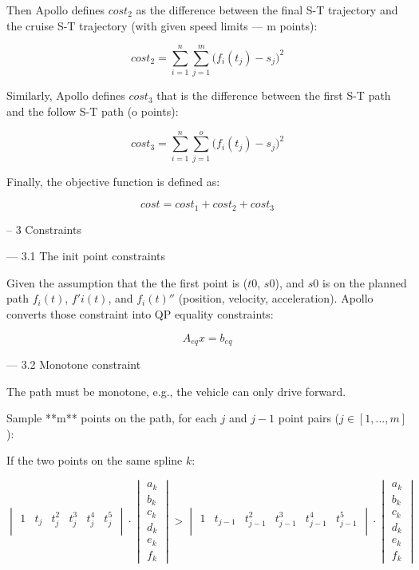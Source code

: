 \documentclass[a4paper,11pt]{article}  %
\begin{document}
Then Apollo defines $cost_2$ as the difference between the final S-T trajectory and the cruise S-T trajectory (with given speed limits — m points):

$$
cost_2 = \sum_{i=1}^{n}\sum_{j=1}^{m}\Big(f_i(t_j)- s_j\Big)^2
$$

Similarly, Apollo defines $cost_3$ that is the difference between the first S-T path and the follow S-T path (o points):

$$
cost_3 = \sum_{i=1}^{n}\sum_{j=1}^{o}\Big(f_i(t_j)- s_j\Big)^2
$$

Finally, the objective function is defined as: 

$$
cost = cost_1 + cost_2 + cost_3
$$


-- 3  Constraints  

--- 3.1 The init point constraints

Given the assumption that the the first point is ($t0$, $s0$), and $s0$ is on the planned path $f_i(t)$, $f'i(t)$, and $f_i(t)''$ (position, velocity, acceleration).  Apollo converts those constraint into QP equality constraints:

$$
A_{eq}x = b_{eq}
$$


--- 3.2  Monotone constraint

The path must be monotone, e.g., the vehicle can only drive forward. 

Sample **m** points on the path, for each $j$ and $j-1$ point pairs ($j\in[1,...,m]$): 

If the two points on the same spline $k$:

$$
\begin{vmatrix}  1 & t_j & t_j^2 & t_j^3 & t_j^4&t_j^5 \\ \end{vmatrix} 
\cdot 
\begin{vmatrix}  a_k \\ b_k \\ c_k \\ d_k \\ e_k \\ f_k  \end{vmatrix} 
> 
\begin{vmatrix}  1 & t_{j-1} & t_{j-1}^2 & t_{j-1}^3 & t_{j-1}^4&t_{j-1}^5 \\ \end{vmatrix}  
\cdot 
\begin{vmatrix}  a_{k} \\ b_{k} \\ c_{k} \\ d_{k} \\ e_{k} \\ f_{k}  \end{vmatrix}
$$
\end{document}
